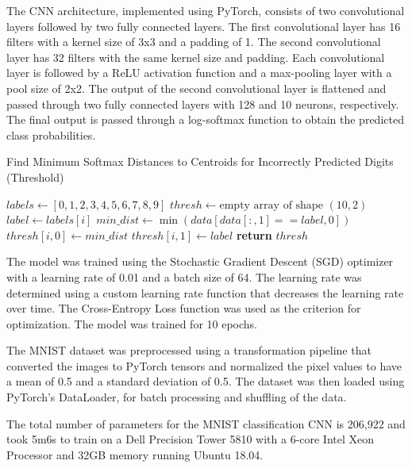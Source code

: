 The CNN architecture, implemented using PyTorch, consists of two convolutional layers followed by two fully connected layers. The first convolutional layer has 16 filters with a kernel size of 3x3 and a padding of 1. The second convolutional layer has 32 filters with the same kernel size and padding. Each convolutional layer is followed by a ReLU activation function and a max-pooling layer with a pool size of 2x2. The output of the second convolutional layer is flattened and passed through two fully connected layers with 128 and 10 neurons, respectively. The final output is passed through a log-softmax function to obtain the predicted class probabilities.
\begin{algorithm}
\caption{Find Minimum Softmax Distances to Centroids for Incorrectly Predicted Digits (Threshold)}
\label{alg:min_distance} 
\begin{algorithmic}[1]
    \State $labels \gets [0, 1, 2, 3, 4, 5, 6, 7, 8, 9]$
    \State $thresh \gets \text{empty array of shape } (10, 2)$
        \State $label \gets labels[i]$
        \State $min\_dist \gets \min(data[data[:, 1] == label, 0])$
        \State $thresh[i, 0] \gets min\_dist$
        \State $thresh[i, 1] \gets label$
    \EndFor
    \State \textbf{return} $thresh$
\EndProcedure
\end{algorithmic}
\end{algorithm}
The model was trained using the Stochastic Gradient Descent (SGD) optimizer with a learning rate of 0.01 and a batch size of 64. The learning rate was determined using a custom learning rate function that decreases the learning rate over time. The Cross-Entropy Loss function was used as the criterion for optimization. The model was trained for 10 epochs.

The MNIST dataset was preprocessed using a transformation pipeline that converted the images to PyTorch tensors and normalized the pixel values to have a mean of 0.5 and a standard deviation of 0.5. The dataset was then loaded using PyTorch's DataLoader, for batch processing and shuffling of the data.

The total number of parameters for the MNIST classification CNN is 206,922 and took 5m6s to train on a Dell Precision Tower 5810 with a 6-core Intel Xeon Processor and 32GB memory running Ubuntu 18.04.  

